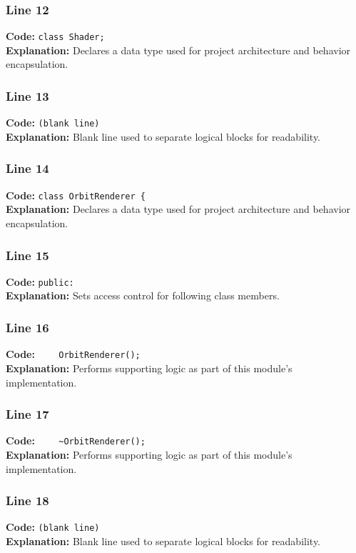\documentclass[11pt,a4paper]{article}
\begin{document}
\subsubsection*{Line 12}
\textbf{Code:} \verb|class Shader;|\\
\textbf{Explanation:} Declares a data type used for project architecture and behavior encapsulation.

\subsubsection*{Line 13}
\textbf{Code:} \texttt{(blank line)}\\
\textbf{Explanation:} Blank line used to separate logical blocks for readability.

\subsubsection*{Line 14}
\textbf{Code:} \verb|class OrbitRenderer {|\\
\textbf{Explanation:} Declares a data type used for project architecture and behavior encapsulation.

\subsubsection*{Line 15}
\textbf{Code:} \verb|public:|\\
\textbf{Explanation:} Sets access control for following class members.

\subsubsection*{Line 16}
\textbf{Code:} \verb|    OrbitRenderer();|\\
\textbf{Explanation:} Performs supporting logic as part of this module's implementation.

\subsubsection*{Line 17}
\textbf{Code:} \verb|    ~OrbitRenderer();|\\
\textbf{Explanation:} Performs supporting logic as part of this module's implementation.

\subsubsection*{Line 18}
\textbf{Code:} \texttt{(blank line)}\\
\textbf{Explanation:} Blank line used to separate logical blocks for readability.
\end{document}
